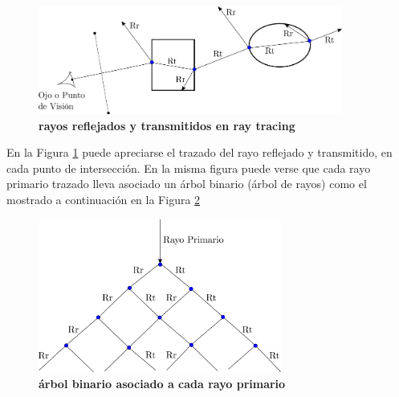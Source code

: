 \begin{figure}[h]
    \includegraphics[width=10cm]{Img/CPD/grafica10.png}
    \centering
    \caption{\textbf{\footnotesize{ rayos reflejados y transmitidos en ray tracing  }}}
    \label{fig:grafica10}
\end{figure}

En la Figura \ref{fig:grafica10} puede apreciarse el trazado del rayo reflejado y transmitido, en cada punto de intersección. En la misma figura puede verse que cada rayo primario trazado lleva asociado un árbol binario (árbol de rayos) como el mostrado a continuación en la Figura \ref{fig:grafica11}

\begin{figure}[h]
    \includegraphics[width=8cm]{Img/CPD/grafica11.png}
    \centering
    \caption{\textbf{\footnotesize{  árbol binario asociado a cada rayo primario  }}}
    \label{fig:grafica11}
\end{figure}

